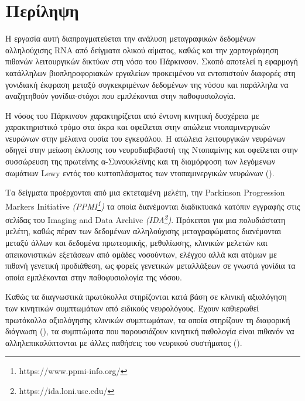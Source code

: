 \documentclass[12pt]{article}
\begin{document}
    \section*{Περίληψη}
        \begin{spacing}{1.5}
            \par
                H εργασία αυτή διαπραγματεύεται την ανάλυση μεταγραφικών δεδομένων αλληλούχισης RNA από δείγματα ολικού αίματος, καθώς και την χαρτογράφηση πιθανών λειτουργικών δικτύων στη νόσο του Πάρκινσον. Σκοπό αποτελεί η εφαρμογή κατάλληλων βιοπληροφοριακών εργαλείων προκειμένου να εντοπιστούν διαφορές στη γονιδιακή έκφραση μεταξύ συγκεκριμένων δεδομένων της νόσου και παράλληλα να αναζητηθούν γονίδια-στόχοι που εμπλέκονται στην παθοφυσιολογία.
            \par
                Η νόσος του Πάρκινσον χαρακτηρίζεται από έντονη κινητική δυσχέρεια με χαρακτηριστικό τρόμο στα άκρα και οφείλεται στην απώλεια ντοπαμινεργικών νευρώνων στην μέλαινα ουσία του εγκεφάλου. Η απώλεια λειτουργικών νευρώνων οδηγεί στην μείωση έκλυσης του νευροδιαβιβαστή της Ντοπαμίνης και οφείλεται στην συσσώρευση της πρωτεΐνης α-Συνουκλεϊνης και τη διαμόρφοση των λεγόμενων σωμάτιων Lewy εντός του κυττοπλάσματος των ντοπαμινεργικών νευρώνων (\emph{\cite{Balestrino2020ParkinsonDisease}}).
            \par
                Τα δείγματα προέρχονται από μια εκτεταμένη μελέτη, την Parkinson Progression Markers Initiative \emph{(PPMI\footnote{https://www.ppmi-info.org/})} τα οποία διανέμονται διαδικτυακά κατόπιν εγγραφής στις σελίδας του Imaging and Data Archive \emph{(IDA\footnote{https://ida.loni.usc.edu/})}. Πρόκειται για μια πολυδιάστατη μελέτη, καθώς πέραν των δεδομένων αλληλούχισης μεταγραφώματος διανέμονται μεταξύ άλλων και δεδομένα πρωτεομικής, μεθυλίωσης, κλινικών μελετών και απεικονιστικών εξετάσεων από ομάδες νοσούντων, ελέγχου αλλά και ατόμων με πιθανή γενετική προδιάθεση, ως φορείς γενετικών μεταλλάξεων σε γνωστά γονίδια τα οποία εμπλέκονται στην παθοφυσιολογία της νόσου.
            \par
                Καθώς τα διαγνωστικά πρωτόκολλα στηρίζονται κατά βάση σε κλινική αξιολόγηση των κινητικών συμπτωμάτων από ειδικούς νευρολόγους. Έχουν καθιερωθεί πρωτόκολλα αξιολόγησης κλινικών συμπτωμάτων, τα οποία στηρίζουν τη διαφορική διάγνωση (\emph{\cite{Koller2018TableGuidelines}}), τα συμπτώματα που παρουσιάζουν κινητική παθολογία είναι πιθανόν να αλληλεπικαλύπτονται με άλλες παθήσεις του νευρικού συστήματος (\emph{\cite{Tolosa2021ChallengesDisease}}). 
            \newpage

\end{spacing}
\end{document}
